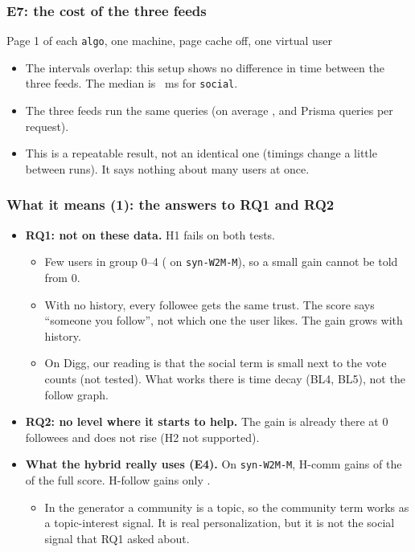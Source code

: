 \documentclass[aspectratio=169,11pt]{beamer}
\newcommand{\resultsdir}{../../results/p7-report}
\begin{document}
\begin{frame}
  \frametitle{E7: the cost of the three feeds}
  \centering
  \small Page 1 of each \texttt{algo}, one machine, page cache off, one virtual user\\[2mm]
  \small
  \resizebox{0.95\textwidth}{!}{}
  \par\vspace{2mm}
  \raggedright
  \begin{itemize}\small
    \item The intervals overlap: this setup shows no difference in time between the three feeds. The median is \eSevenSocialMedian{}~ms for \texttt{social}.
    \item The three feeds run the same queries (on average \eSevenChronoQueriesMean{}, \eSevenEngagementQueriesMean{} and \eSevenSocialQueriesMean{} Prisma queries per request).
    \item This is a repeatable result, not an identical one (timings change a little between runs). It says nothing about many users at once.
  \end{itemize}
\end{frame}

\begin{frame}
  \frametitle{What it means (1): the answers to RQ1 and RQ2}
  \begin{itemize}\small
    \item \textbf{RQ1: not on these data.} H1 fails on both tests.
    \begin{itemize}
      \item Few users in group 0--4 (\eTwoWTwoMNdcgTenZeroFourN{} on \texttt{syn-W2M-M}), so a small gain cannot be told from 0.
      \item With no history, every followee gets the same trust. The score says ``someone you follow'', not which one the user likes. The gain grows with history.
      \item On Digg, our reading is that the social term is small next to the vote counts (not tested). What works there is time decay (BL4, BL5), not the follow graph.
    \end{itemize}
    \item \textbf{RQ2: no level where it starts to help.} The gain is already there at 0 followees and does not rise (H2 not supported).
    \item \textbf{What the hybrid really uses (E4).} On \texttt{syn-W2M-M}, H-comm gains \eFourWTwoMNdcgHCommTenAllGain{} of the \eFourWTwoMNdcgHTenAllGain{} of the full score. H-follow gains only \eFourWTwoMNdcgHFollowTenAllGain{}.
    \begin{itemize}
      \item In the generator a community is a topic, so the community term works as a topic-interest signal. It is real personalization, but it is not the social signal that RQ1 asked about.
    \end{itemize}
  \end{itemize}
\end{frame}
\end{document}
